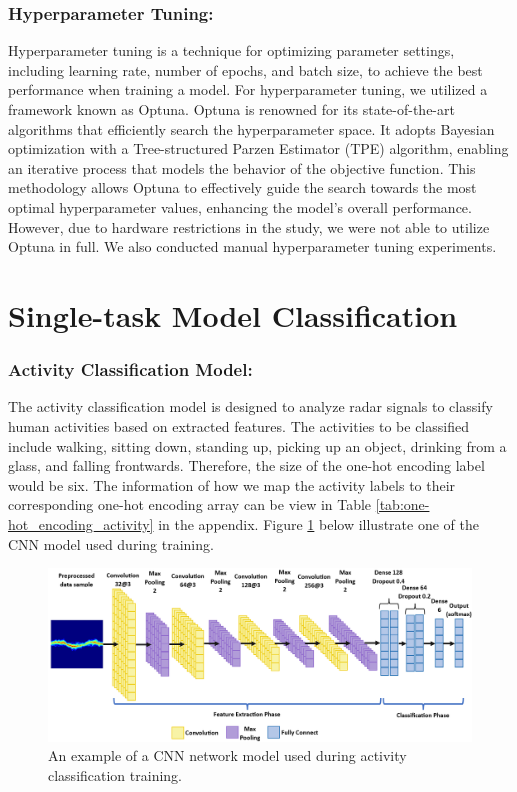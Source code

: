 \documentclass{l4proj}
\begin{document}
\subsubsection{Hyperparameter Tuning:}
Hyperparameter tuning is a technique for optimizing parameter settings, including learning rate, number of epochs, and batch size, to achieve the best performance when training a model. For hyperparameter tuning, we utilized a framework known as Optuna. Optuna is renowned for its state-of-the-art algorithms that efficiently search the hyperparameter space. It adopts Bayesian optimization with a Tree-structured Parzen Estimator (TPE) algorithm, enabling an iterative process that models the behavior of the objective function. This methodology allows Optuna to effectively guide the search towards the most optimal hyperparameter values, enhancing the model's overall performance. However, due to hardware restrictions in the study, we were not able to utilize Optuna in full. We also conducted manual hyperparameter tuning experiments.

\section{Single-task Model Classification}
\subsubsection{Activity Classification Model:}
The activity classification model is designed to analyze radar signals to classify human activities based on extracted features. The activities to be classified include walking, sitting down, standing up, picking up an object, drinking from a glass, and falling frontwards. Therefore, the size of the one-hot encoding label would be six. The information of how we map the activity labels to their corresponding one-hot encoding array can be view in Table \ref{tab:one-hot_encoding_activity} in the appendix. Figure \ref{fig:activity-classification-model} below illustrate one of the CNN model used during training.

\begin{figure}[h]
    \centering
    \includegraphics[width=1.1\linewidth]{images/activity-classification-model.png}
    \caption{An example of a CNN network model used during activity classification training.}
    \label{fig:activity-classification-model}
\end{figure}
\end{document}
